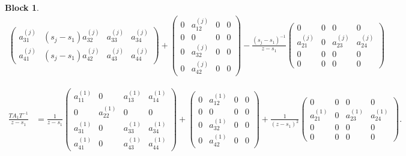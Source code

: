 \documentclass[12pt]{article}
\newtheorem{block}{Block}
\begin{document}
\begin{block}
\[\begin{aligned}
\begin{pmatrix}
        a_{31}^{(j)} & (s_j-s_1)a_{32}^{(j)} & a_{33}^{(j)} & a_{34}^{(j)} \\[10pt]
        a_{41}^{(j)} & (s_j-s_1)a_{42}^{(j)} & a_{43}^{(j)} & a_{44}^{(j)}
    \end{pmatrix}
    + \begin{pmatrix}
        0 & a_{12}^{(j)} & 0 & 0 \\[10pt]
        0 & 0 & 0 & 0 \\[10pt]
        0 & a_{32}^{(j)} & 0 & 0 \\[10pt]
        0 & a_{42}^{(j)} & 0 & 0
    \end{pmatrix}
    -\frac{(s_j-s_1)^{-1}}{z-s_1}
    \begin{pmatrix}
        0 & 0 & 0 & 0 \\[10pt]
        a_{21}^{(j)} & 0 & a_{23}^{(j)}  & a_{24}^{(j)}\\[10pt]
        0 & 0 & 0 & 0 \\[10pt]
        0 & 0 & 0 & 0
    \end{pmatrix}
\end{aligned}
\]


\[
\begin{aligned}
    \frac{T A_1 T^{-1}}{z-s_1} &=
    \frac{1}{z-s_1}
    \begin{pmatrix}
        a_{11}^{(1)} & 0 & a_{13}^{(1)} & a_{14}^{(1)} \\[10pt]
        0 & a_{22}^{(1)} & 0 & 0\\[10pt]
        a_{31}^{(1)} & 0 & a_{33}^{(1)} & a_{34}^{(1)} \\[10pt]
        a_{41}^{(1)} & 0 & a_{43}^{(1)} & a_{44}^{(1)}
    \end{pmatrix}
    +
    \begin{pmatrix}
        0 & a_{12}^{(1)} & 0 & 0 \\[10pt]
        0 & 0 & 0 & 0 \\[10pt]
        0 & a_{32}^{(1)} & 0 & 0 \\[10pt]
        0 & a_{42}^{(1)} & 0 & 0
    \end{pmatrix}
    +\frac{1}{(z-s_1)^2}
    \begin{pmatrix}
        0 & 0 & 0 & 0 \\[10pt]
        a_{21}^{(1)} & 0 & a_{23}^{(1)}  & a_{24}^{(1)}\\[10pt]
        0 & 0 & 0 & 0 \\[10pt]
        0 & 0 & 0 & 0
    \end{pmatrix}.
\end{aligned}
\]


\end{block}
\end{document}
